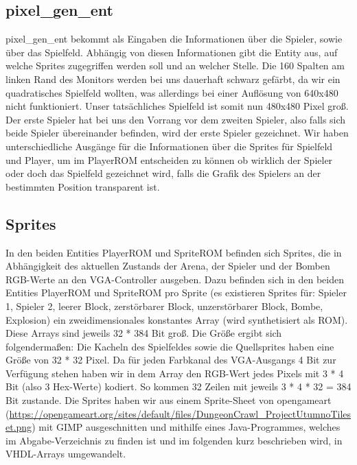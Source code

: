 \documentclass[parskip=full]{scrartcl}
\begin{document}
			\subsection{pixel\_gen\_ent}
				pixel\_gen\_ent bekommt als Eingaben die Informationen über die Spieler, sowie über das Spielfeld. Abhängig von diesen Informationen gibt die Entity aus, auf welche Sprites zugegriffen werden soll und an welcher Stelle.\newline
				Die 160 Spalten am linken Rand des Monitors werden bei uns dauerhaft schwarz gefärbt, da wir ein quadratisches Spielfeld wollten, was allerdings bei einer Auflösung von 640x480 nicht funktioniert. Unser tatsächliches Spielfeld ist somit nun 480x480 Pixel groß.\newline
				Der erste Spieler hat bei uns den Vorrang vor dem zweiten Spieler, also falls sich beide Spieler übereinander befinden, wird der erste Spieler gezeichnet.\newline
				Wir haben unterschiedliche Ausgänge für die Informationen über die Sprites für Spielfeld und Player, um im PlayerROM entscheiden zu können ob wirklich der Spieler oder doch das Spielfeld gezeichnet wird, falls die Grafik des Spielers an der bestimmten Position transparent ist.
		
			\subsection{Sprites}
				In den beiden Entities PlayerROM und SpriteROM befinden sich Sprites, die in Abhängigkeit des aktuellen Zustands der Arena, der Spieler und der Bomben RGB-Werte an den VGA-Controller ausgeben. Dazu befinden sich in den beiden Entities PlayerROM und SpriteROM pro Sprite (es existieren Sprites für: Spieler 1, Spieler 2, leerer Block, zerstörbarer Block, unzerstörbarer Block, Bombe, Explosion) ein zweidimensionales konstantes Array (wird synthetisiert als ROM). Diese Arrays sind jeweils 32 * 384 Bit groß. \newline
				Die Größe ergibt sich folgendermaßen: Die Kacheln des Spielfeldes sowie die Quellsprites haben eine Größe von 32 * 32 Pixel. Da für jeden Farbkanal des VGA-Ausgangs 4 Bit zur Verfügung stehen haben wir in dem Array den RGB-Wert jedes Pixels mit 3 * 4 Bit (also 3 Hex-Werte) kodiert. So kommen 32 Zeilen mit jeweils 
				3 * 4 * 32 = 384 Bit zustande. \newline
				Die Sprites haben wir aus einem Sprite-Sheet von opengameart (\url{https://opengameart.org/sites/default/files/DungeonCrawl_ProjectUtumnoTileset.png}) mit GIMP ausgeschnitten und mithilfe eines Java-Programmes, welches im Abgabe-Verzeichnis zu finden ist und im folgenden kurz beschrieben wird, in VHDL-Arrays umgewandelt.
\end{document}
